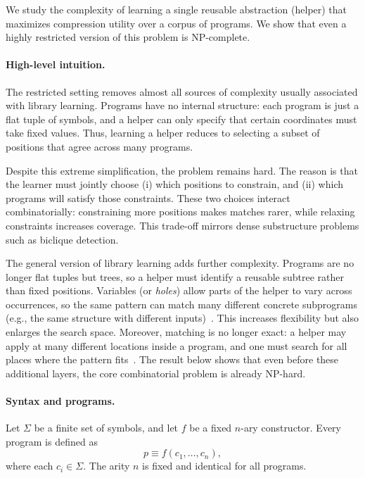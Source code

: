We study the complexity of learning a single reusable abstraction (helper)
that maximizes compression utility over a corpus of programs. We show that
even a highly restricted version of this problem is NP-complete.

\par\noindent
\paragraph{High-level intuition.}
The restricted setting removes almost all sources of complexity usually
associated with library learning. Programs have no internal structure:
each program is just a flat tuple of symbols, and a helper can only specify
that certain coordinates must take fixed values. Thus, learning a helper
reduces to selecting a subset of positions that agree across many programs.

Despite this extreme simplification, the problem remains hard. The reason is
that the learner must jointly choose (i) which positions to constrain, and
(ii) which programs will satisfy those constraints. These two choices
interact combinatorially: constraining more positions makes matches rarer,
while relaxing constraints increases coverage. This trade-off mirrors dense
substructure problems such as biclique detection.

The general version of library learning adds further complexity. Programs
are no longer flat tuples but trees, so a helper must identify a reusable
subtree rather than fixed positions. Variables (or \emph{holes}) allow parts
of the helper to vary across occurrences, so the same pattern can match
many different concrete subprograms (e.g., the same structure with different
inputs)~\cite{dechter2013bootstrap,ellis2023dreamcoder,cao2023babble,bowers2023top}. This increases flexibility but also enlarges the search
space. Moreover, matching is no longer exact: a helper may apply at many
different locations inside a program, and one must search for all places
where the pattern fits~\cite{bowers2023top}. The result below shows that even before these
additional layers, the core combinatorial problem is already NP-hard.

\par\noindent
\paragraph{Syntax and programs.}
Let $\Sigma$ be a finite set of symbols, and let $f$ be a fixed $n$-ary
constructor. Every program is defined as
\[
p \equiv f(c_1, \dots, c_n),
\]
where each $c_i \in \Sigma$. The arity $n$ is fixed and identical for all
programs.

